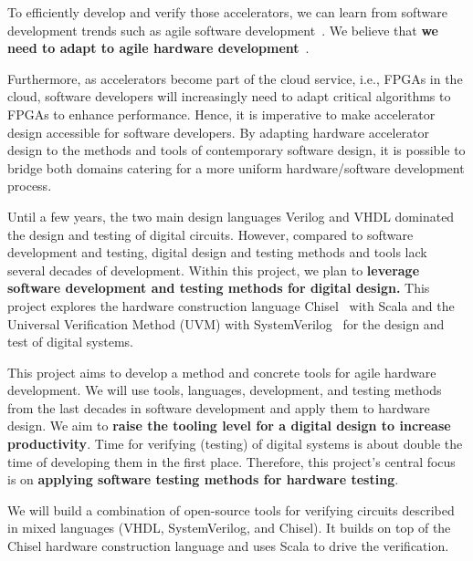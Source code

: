 \documentclass[fleqn,12pt]{article}
\begin{document}
To efficiently develop and verify those accelerators, we can learn from software development trends such as agile software development~\cite{agile:manifesto}.
We believe that {\bf we need to adapt to agile hardware development}~\cite{henn-patt:turing:2019}.

Furthermore, as accelerators become part of the cloud service, i.e., FPGAs in the cloud,
software developers will increasingly need to adapt critical algorithms to FPGAs to enhance performance.
Hence, it is imperative to make accelerator design accessible for software developers.
By adapting hardware accelerator design to the methods and tools of contemporary software design,
it is possible to bridge both domains catering for a more uniform hardware/software development process.

Until a few years, the two main design languages Verilog and VHDL dominated the
design and testing of digital circuits.
However, compared to software development and testing, digital design and testing methods
and tools lack several decades of development. Within this project, we plan to
{\bf leverage software development and testing methods for digital design.}
This project explores the hardware construction language Chisel~\cite{chisel:dac2012} with Scala
and the Universal Verification Method (UVM) with SystemVerilog~\cite{SystemVerilog} for
the design and test of digital systems.

This project aims to develop a method and concrete tools for agile hardware development.
We will use tools, languages, development, and testing methods from the last decades in
software development and apply them to hardware design.
We aim to {\bf raise the tooling level for a digital design to increase productivity}.
Time for verifying (testing) of digital systems is about double the time of developing
them in the first place.
Therefore, this project's central focus is on {\bf applying software
testing methods for hardware testing}.

We will build a combination of open-source tools for verifying
circuits described in mixed languages (VHDL, SystemVerilog, and Chisel).
It builds on top of the Chisel hardware construction language and uses Scala to drive the verification. 

\end{document}
